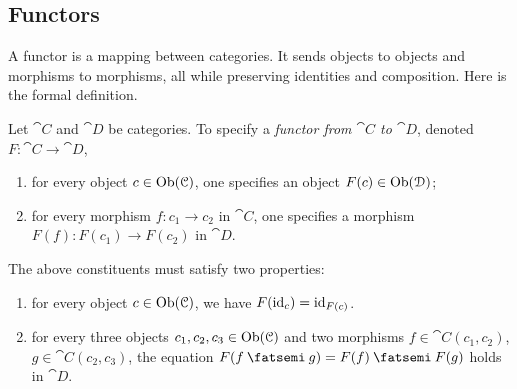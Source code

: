 \documentclass[7Sketches]{subfiles}
\begin{document}
\subsection{Functors}%
\label{sec.functors}%

A functor is a mapping between categories. It sends objects to objects and morphisms to morphisms, all while preserving identities and composition. Here is the formal definition.

\begin{definition}%
Let $\cat{C}$ and $\cat{D}$ be categories. To specify a \emph{functor from $\cat{C}$ to $\cat{D}$}, denoted $F\colon\cat{C}\to\cat{D}$, 
\begin{enumerate}[label=(\roman*)]
	\item for every object $c\in\operatorname{Ob}(\mathcal{C})$, one specifies an object $F(c)\in\operatorname{Ob}(\mathcal{D})$;
	\item for every morphism $f\colon c_1\to c_2$ in $\cat{C}$, one specifies a morphism $F(f)\colon F(c_1)\to F(c_2)$ in $\cat{D}$.
\end{enumerate}
The above constituents must satisfy two properties:
\begin{enumerate}[label=(\alph*)]
	\item for every object $c\in\operatorname{Ob}(\mathcal{C})$, we have $F(\mathrm{id}_c)=\mathrm{id}_{F(c)}$.
	\item for every three objects $c_1,c_2,c_3\in\operatorname{Ob}(\mathcal{C})$ and two morphisms $f\in\cat{C}(c_1,c_2)$, $g\in\cat{C}(c_2,c_3)$, the equation $F(f\cp g)=F(f)\cp F(g)$ holds in $\cat{D}$.
\end{enumerate}
\end{definition}
\end{document}
